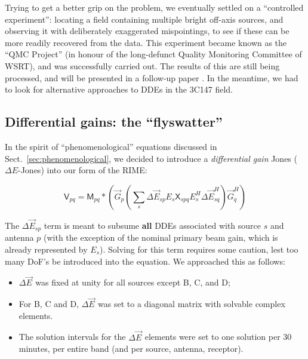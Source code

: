 \documentclass[]{aa}
\newcommand{\herm}{H}
\newcommand{\jones}[2]{\vec {#1}_{#2}}
\newcommand{\jonesT}[2]{\vec {#1}^{\herm}_{#2}}
\newcommand{\coh}[2]{\mathsf{{#1}}_{{#2}}}
\begin{document}
Trying to get a better grip on the problem, we eventually settled on a ``controlled experiment'':
locating a field containing multiple bright off-axis sources, and observing it with deliberately exaggerated mispointings, to see if these can be more readily recovered from the data. This experiment became known as the ``QMC Project'' (in honour of the long-defunct Quality Monitoring Committee of WSRT), and was successfully carried out. The results of this are still being processed, and will be presented in a follow-up paper \citep{QMC}. 
In the meantime, we had to look for alternative approaches to DDEs in the 3C147 field.

\subsection{Differential gains: the ``flyswatter''\label{sec:diffgains}}

In the spirit of ``phenomenological'' equations discussed in Sect.~\ref{sec:phenomenological}, we decided to introduce a {\em differential gain} Jones ($\Delta E$-Jones) into our form of the RIME:

\begin{equation}\label{eq:3C147:de}
\coh{V}{pq} = \coh{M}{pq} \ast \left ( \jones{G}{p} \left( \sum_s \Delta\jones{E}{sp} E_s \coh{X}{spq} E^{\herm}_s \Delta\jonesT{E}{sq} \right)  \jonesT{G}{q} \right )
\end{equation}

The $\Delta\jones{E}{sp}$ term is meant to subsume {\bf all} DDEs associated with source $s$ and antenna $p$ (with the exception of the nominal primary beam gain, which is already represented by $E_s$). Solving for this term requires some caution, lest too many DoF's be introduced into the equation. We approached this as follows:

\begin{itemize}
\item $\Delta\jones{E}{}$ was fixed at unity for all sources except B, C, and D;
\item For B, C and D, $\Delta\jones{E}{}$ was set to a diagonal matrix with solvable complex elements.
\item The solution intervals for the $\Delta\jones{E}{}$ elements were set to one solution per 30 minutes, per entire band (and per source, antenna, receptor).
\end{itemize}
\end{document}
